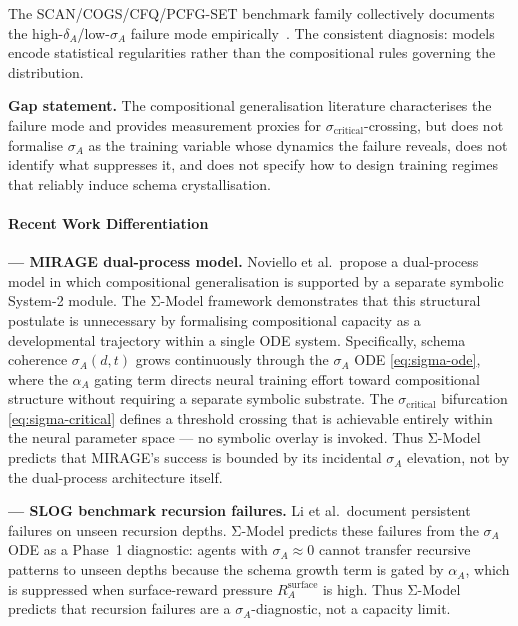 \documentclass[11pt]{article}
\theoremstyle{definition}
\theoremstyle{plain}
\begin{document}
The SCAN/COGS/CFQ/PCFG-SET benchmark family collectively documents the
high-$\delta_A$/low-$\sigma_A$ failure mode empirically~\citep{mondorf2026compositionalarc}.
The consistent diagnosis: models encode statistical regularities rather than the
compositional rules governing the distribution.

\textbf{Gap statement.} The compositional generalisation literature
characterises the failure mode and provides measurement proxies for
$\sigma_{\text{critical}}$-crossing, but does not formalise $\sigma_A$
as the training variable whose dynamics the failure reveals, does not
identify what suppresses it, and does not specify how to design training
regimes that reliably induce schema crystallisation.

\paragraph{Recent Work Differentiation}

\textbf{\cite{noviello2025neuroscienceinspiredualprocess} --- MIRAGE dual-process model.}
Noviello et al.\ propose a dual-process model in which compositional
generalisation is supported by a separate symbolic System-2 module. The Σ-Model framework demonstrates that
this structural postulate is unnecessary by formalising compositional
capacity as a developmental trajectory within a single ODE system.
Specifically, schema coherence $\sigma_A(d,t)$ grows continuously
through the $\sigma_A$ ODE \eqref{eq:sigma-ode}, where the
$\alpha_A$ gating term directs neural training effort toward
compositional structure without requiring a separate symbolic substrate.
The $\sigma_{\text{critical}}$ bifurcation \eqref{eq:sigma-critical}
defines a threshold crossing that is achievable entirely within the
neural parameter space --- no symbolic overlay is invoked.
Thus Σ-Model predicts that MIRAGE's success is bounded by its incidental
$\sigma_A$ elevation, not by the dual-process architecture itself.

\textbf{\cite{li2023slogstructuralgeneralizationbenchmark} --- SLOG benchmark recursion failures.}
Li et al.\ document persistent failures on unseen recursion depths.
Σ-Model predicts these failures from the $\sigma_A$ ODE as a Phase~1
diagnostic: agents with $\sigma_A \approx 0$ cannot transfer recursive
patterns to unseen depths because the schema growth term is gated by
$\alpha_A$, which is suppressed when surface-reward pressure
$R_A^{\text{surface}}$ is high.
Thus Σ-Model predicts that recursion failures are a
$\sigma_A$-diagnostic, not a capacity limit.
\end{document}
